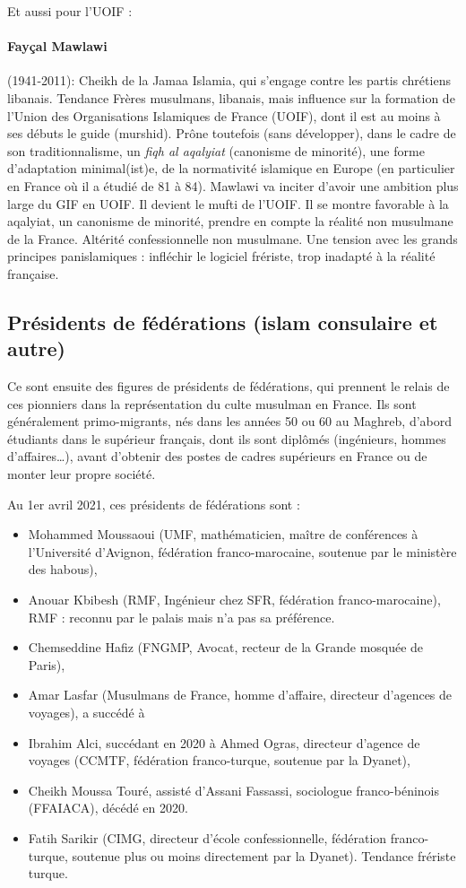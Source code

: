 Et aussi pour l'UOIF : 
\paragraph{Fayçal Mawlawi} (1941-2011): Cheikh de la Jamaa Islamia, qui s'engage contre les partis chrétiens libanais. Tendance Frères musulmans, libanais, mais influence sur la formation de l’Union des Organisations Islamiques de France (UOIF), dont il est au moins à ses débuts le guide (murshid). Prône toutefois (sans développer), dans le cadre de son traditionnalisme, un \textit{fiqh al aqalyiat} (canonisme de minorité), une forme d’adaptation minimal(ist)e, de la normativité islamique en Europe (en particulier en France où il a étudié de 81 à 84). Mawlawi va inciter d'avoir une ambition plus large du GIF en UOIF. Il devient le mufti de l'UOIF. Il se montre favorable à la aqalyiat, un canonisme de minorité, prendre en compte la réalité non musulmane de la France.  Altérité confessionnelle non musulmane. Une tension avec les grands principes panislamiques : infléchir le logiciel frériste, trop inadapté à la réalité française.  



\subsection{Présidents de fédérations (islam consulaire et autre)}

Ce sont ensuite des figures de présidents de fédérations, qui prennent le relais de ces pionniers dans la représentation du culte musulman en France. Ils sont généralement primo-migrants, nés dans les années 50 ou 60 au Maghreb, d’abord étudiants dans le supérieur français, dont ils sont diplômés (ingénieurs, hommes d’affaires…), avant d’obtenir des postes de cadres supérieurs en France ou de monter leur propre société. 

Au 1er avril 2021, ces présidents de fédérations sont : 
\begin{itemize}
    \item Mohammed Moussaoui (UMF, mathématicien, maître de conférences à l’Université d’Avignon, fédération franco-marocaine, soutenue par le ministère des habous),
    \item Anouar Kbibesh (RMF, Ingénieur chez SFR, fédération franco-marocaine), RMF : reconnu par le palais mais n'a pas sa préférence.
    \item Chemseddine Hafiz (FNGMP, Avocat, recteur de la Grande mosquée de Paris),
    \item Amar Lasfar (Musulmans de France, homme d’affaire, directeur d’agences de voyages), a succédé à 
    \item Ibrahim Alci, succédant en 2020 à Ahmed Ogras, directeur d’agence de voyages (CCMTF, fédération franco-turque, soutenue par la Dyanet), 
    \item Cheikh Moussa Touré, assisté d’Assani Fassassi, sociologue franco-béninois (FFAIACA), décédé en 2020.
    \item Fatih Sarikir (CIMG, directeur d’école confessionnelle, fédération franco-turque, soutenue plus ou moins directement par la Dyanet). Tendance frériste turque.

\end{itemize}
    
